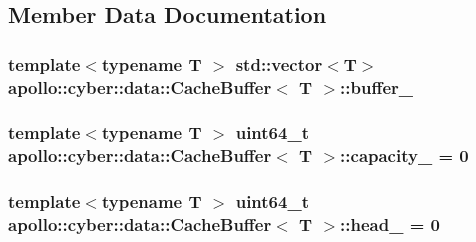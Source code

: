\subsection{Member Data Documentation}
\hypertarget{classapollo_1_1cyber_1_1data_1_1CacheBuffer_ab452281ecd9ee969582fca3fda207a3a}{
\subsubsection[{buffer\-\_\-}]{\setlength{\rightskip}{0pt plus 5cm}template$<$typename T $>$ std\-::vector$<$T$>$ {\bf apollo\-::cyber\-::data\-::\-Cache\-Buffer}$<$ T $>$\-::buffer\-\_\-\hspace{0.3cm}{\ttfamily [private]}}}\label{classapollo_1_1cyber_1_1data_1_1CacheBuffer_ab452281ecd9ee969582fca3fda207a3a}
\hypertarget{classapollo_1_1cyber_1_1data_1_1CacheBuffer_a8b100fbcee82983f35f98822907e82bc}{
\subsubsection[{capacity\-\_\-}]{\setlength{\rightskip}{0pt plus 5cm}template$<$typename T $>$ uint64\-\_\-t {\bf apollo\-::cyber\-::data\-::\-Cache\-Buffer}$<$ T $>$\-::capacity\-\_\- = 0\hspace{0.3cm}{\ttfamily [private]}}}\label{classapollo_1_1cyber_1_1data_1_1CacheBuffer_a8b100fbcee82983f35f98822907e82bc}
\hypertarget{classapollo_1_1cyber_1_1data_1_1CacheBuffer_ad93c0d4ea1554ca5cd755d7b2a920d9a}{
\subsubsection[{head\-\_\-}]{\setlength{\rightskip}{0pt plus 5cm}template$<$typename T $>$ uint64\-\_\-t {\bf apollo\-::cyber\-::data\-::\-Cache\-Buffer}$<$ T $>$\-::head\-\_\- = 0\hspace{0.3cm}{\ttfamily [private]}}}\label{classapollo_1_1cyber_1_1data_1_1CacheBuffer_ad93c0d4ea1554ca5cd755d7b2a920d9a}
